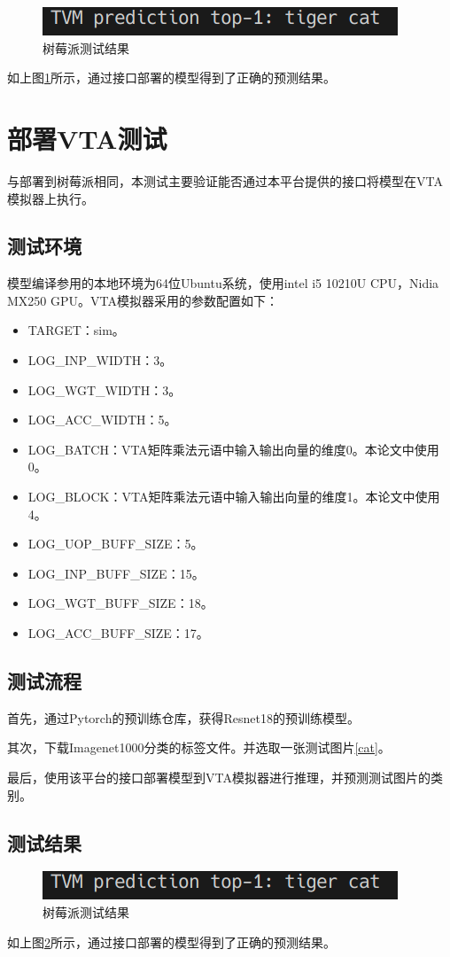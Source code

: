\begin{figure}
    \centering
    \includegraphics[width=180bp]{figure/expr_rasp.png}
    \caption{树莓派测试结果}
    \label{expr_rasp}
\end{figure}

如上图\ref{expr_rasp}所示，通过接口部署的模型得到了正确的预测结果。


\section{部署VTA测试}

与部署到树莓派相同，本测试主要验证能否通过本平台提供的接口将模型在VTA模拟器上执行。

\subsection{测试环境}

模型编译参用的本地环境为64位Ubuntu系统，使用intel i5 10210U CPU，Nidia MX250 GPU。VTA模拟器采用的参数配置如下：
\begin{itemize}
    \item {TARGET：sim。}
    \item {LOG\_INP\_WIDTH：3。}
    \item {LOG\_WGT\_WIDTH：3。}
    \item {LOG\_ACC\_WIDTH：5。}
    \item {LOG\_BATCH：VTA矩阵乘法元语中输入输出向量的维度0。本论文中使用0。}
    \item {LOG\_BLOCK：VTA矩阵乘法元语中输入输出向量的维度1。本论文中使用4。}
    \item {LOG\_UOP\_BUFF\_SIZE：5。}
    \item {LOG\_INP\_BUFF\_SIZE：15。}
    \item {LOG\_WGT\_BUFF\_SIZE：18。}
    \item {LOG\_ACC\_BUFF\_SIZE：17。}
\end{itemize}


\subsection{测试流程}

首先，通过Pytorch的预训练仓库，获得Resnet18的预训练模型。

其次，下载Imagenet1000分类的标签文件。并选取一张测试图片\ref{cat}。

最后，使用该平台的接口部署模型到VTA模拟器进行推理，并预测测试图片的类别。


\subsection{测试结果}

\begin{figure}
    \centering
    \includegraphics[width=180bp]{figure/expr_rasp.png}
    \caption{树莓派测试结果}
    \label{expr_vta}
\end{figure}

如上图\ref{expr_vta}所示，通过接口部署的模型得到了正确的预测结果。
